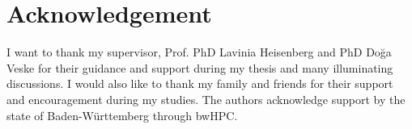 \section{Acknowledgement}
I want to thank my supervisor, Prof. PhD Lavinia Heisenberg and PhD Do\u{g}a Veske for their guidance and support during my thesis and many illuminating discussions. I would also like to thank my family and friends for their support and encouragement during my studies. The authors acknowledge support by the state of Baden-Württemberg through bwHPC.
